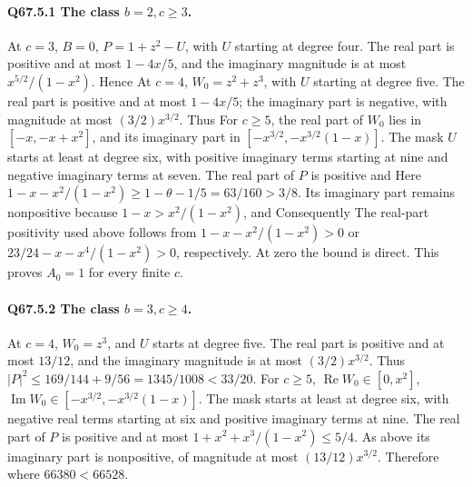 \paragraph{Q67.5.1 The class \(b=\allowbreak 2,\allowbreak c\ge\allowbreak 3\).}
At \(c=\allowbreak 3\), \(B=\allowbreak 0\), \(P=\allowbreak 1+z^2-U\), with \(U\) starting at degree
four. The real part is positive and at most \(1-4x/5\), and the
imaginary magnitude is at most \(x^{5/2}/(1-x^2)\). Hence
At \(c=\allowbreak 4\), \(W_0=\allowbreak z^2+z^3\), with \(U\) starting at degree five.
The real part is positive and at most \(1-4x/5\); the imaginary
part is negative, with magnitude at most \((3/2)x^{3/2}\). Thus
For \(c\ge\allowbreak 5\), the real part of \(W_0\) lies in
\([-x,\allowbreak -x+x^2]\), and its imaginary part in
\([-x^{3/2},\allowbreak -x^{3/2}(1-x)]\).
The mask \(U\) starts at least at degree six, with positive imaginary
terms starting at nine and negative imaginary terms at seven.
The real part of \(P\) is positive and
Here \(1-x-x^2/(1-x^2)\ge\allowbreak 1-\theta-1/5=\allowbreak 63/160>\allowbreak 3/8\).
Its imaginary part remains nonpositive because
\(1-x>\allowbreak x^2/(1-x^2)\), and
Consequently
The real-part positivity used above follows from
\(1-x-x^2/(1-x^2)>\allowbreak 0\) or
\(23/24-x-x^4/(1-x^2)>\allowbreak 0\), respectively. At zero the bound is direct.
This proves \(A_0=\allowbreak 1\) for every finite \(c\).

\paragraph{Q67.5.2 The class \(b=\allowbreak 3,\allowbreak c\ge\allowbreak 4\).}
At \(c=\allowbreak 4\), \(W_0=\allowbreak z^3\), and \(U\) starts at degree five.
The real part is positive and at most \(13/12\), and the imaginary
magnitude is at most \((3/2)x^{3/2}\). Thus
\(|P|^2\le\allowbreak 169/144+9/56=\allowbreak 1345/1008<\allowbreak 33/20\).
For \(c\ge\allowbreak 5\), \(\operatorname{Re}W_0\in[0,\allowbreak x^2]\),
\(\operatorname{Im}W_0\in[-x^{3/2},\allowbreak -x^{3/2}(1-x)]\).
The mask starts at least at degree six, with negative real terms
starting at six and positive imaginary terms at nine.
The real part of \(P\) is positive and at most
\(1+x^2+x^3/(1-x^2)\le\allowbreak 5/4\).
As above its imaginary part is nonpositive, of magnitude at most
\((13/12)x^{3/2}\). Therefore
where \(66380<\allowbreak 66528\).

